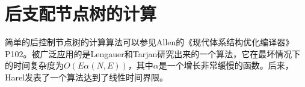 \section{后支配节点树的计算}\label{app:algo_ipdom_tree}

简单的后控制节点树的计算算法可以参见Allen的《现代体系结构优化编译器》P102。被广泛应用的是Lengauer和Tarjan研究出来的一个算法\cite{Lengauer1979}，它在最坏情况下的时间复杂度为$O\left(E\alpha\left(N,E\right)\right)$，其中$\alpha$是一个增长非常缓慢的函数。后来，Harel发表了一个算法达到了线性时间界限\cite{Harel1985}。